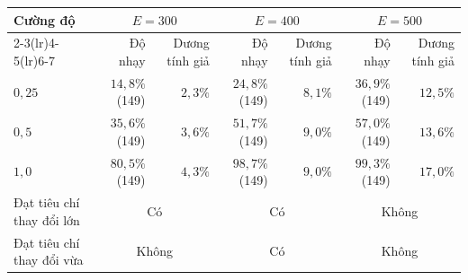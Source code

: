 \begin{tabular}{lrrrrrr}
\toprule
Cường độ & \multicolumn{2}{c}{$E=300$} & \multicolumn{2}{c}{$E=400$} & \multicolumn{2}{c}{$E=500$} \\
\cmidrule(lr){2-3}\cmidrule(lr){4-5}\cmidrule(lr){6-7}
 & Độ nhạy & Dương tính giả & Độ nhạy & Dương tính giả & Độ nhạy & Dương tính giả \\
\midrule
$0{,}25$ & $14{,}8\%$ (149) & $2{,}3\%$ & $24{,}8\%$ (149) & $8{,}1\%$ & $36{,}9\%$ (149) & $12{,}5\%$ \\
$0{,}5$ & $35{,}6\%$ (149) & $3{,}6\%$ & $51{,}7\%$ (149) & $9{,}0\%$ & $57{,}0\%$ (149) & $13{,}6\%$ \\
$1{,}0$ & $80{,}5\%$ (149) & $4{,}3\%$ & $98{,}7\%$ (149) & $9{,}0\%$ & $99{,}3\%$ (149) & $17{,}0\%$ \\
\midrule
Đạt tiêu chí thay đổi lớn & \multicolumn{2}{c}{Có} & \multicolumn{2}{c}{Có} & \multicolumn{2}{c}{Không} \\
Đạt tiêu chí thay đổi vừa & \multicolumn{2}{c}{Không} & \multicolumn{2}{c}{Có} & \multicolumn{2}{c}{Không} \\
\bottomrule
\end{tabular}
